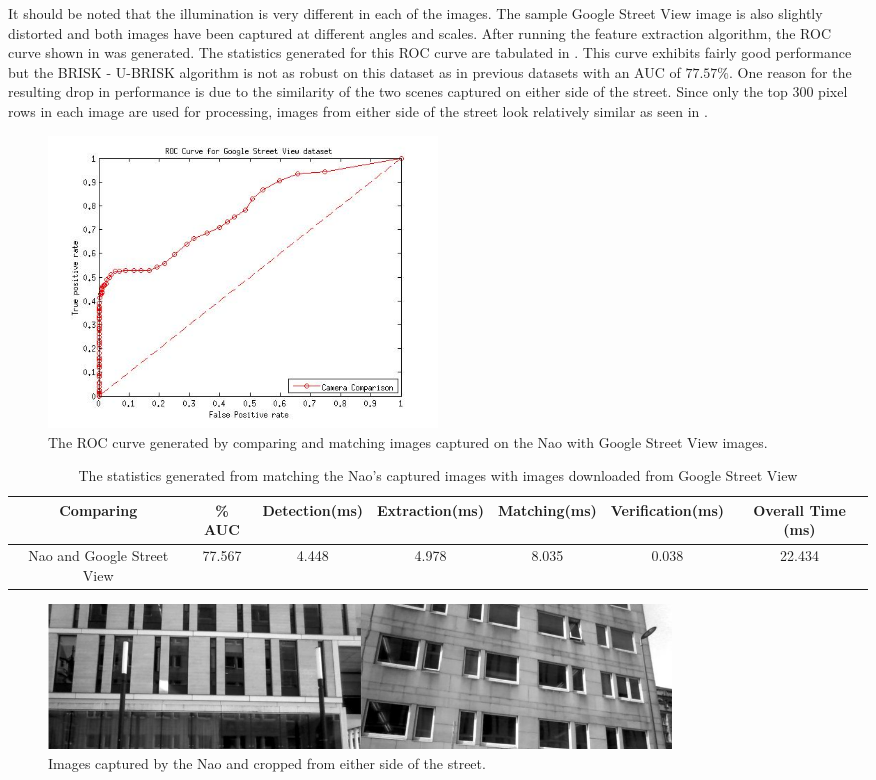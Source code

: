 \documentclass{report}
\begin{document}
It should be noted that the illumination is very different in each of the images. The sample Google Street View image is also slightly distorted and both images have been captured at different angles and scales. After running the feature extraction algorithm, the ROC curve shown in  was generated. The statistics generated for this ROC curve are tabulated in . This curve exhibits fairly good performance but the BRISK - U-BRISK algorithm is not as robust on this dataset as in previous datasets with an AUC of $77.57\%$. One reason for the resulting drop in performance is due to the similarity of the two scenes captured on either side of the street. Since only the top $300$ pixel rows in each image are used for processing, images from either side of the street look relatively similar as seen in .\\

 \begin{figure}[h!] 
  \centering
    \includegraphics[width=0.5\textwidth]{../Drawings/streetView/ROC_StreetView.jpg}
    \caption{The ROC curve generated by comparing and matching images captured on the Nao with Google Street View images.}
    \label{fig:rocGoogleStreet}
\end{figure}

\begin{table}
\caption{The statistics generated from matching the Nao's captured images with
images downloaded from Google Street View}
\begin{tabular}{|c|c|c|c|c|c|c|}
\hline 
Comparing & \% AUC & Detection(ms) & Extraction(ms) & Matching(ms) & Verification(ms) & Overall Time (ms)\tabularnewline
\hline 
\hline 
Nao and Google Street View & 77.567 & 4.448 & 4.978 & 8.035 & 0.038 & 22.434\tabularnewline
\hline 
\end{tabular}
\label{tab:naoGoogleStreetRoc}
\end{table}

 \begin{figure}[h!] 
  \centering
    \includegraphics[width=0.8\textwidth]{../Drawings/streetView/similarGooglePics.jpg}
    \caption{Images captured by the Nao and cropped from either side of the street.}
    \label{fig:similarGoogleStreetView}
\end{figure}
\end{document}
